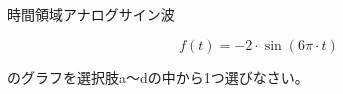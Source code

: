 時間領域アナログサイン波

\[
f(t) = -2 \cdot \sin( 6 \pi \cdot t)
\]

\bigskip
\noindent  のグラフを選択肢a〜dの中から1つ選びなさい。
